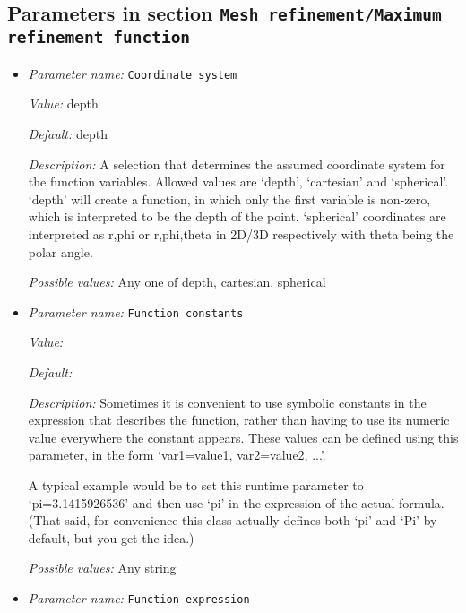 \subsection{Parameters in section \tt Mesh refinement/Maximum refinement function}
\label{parameters:Mesh_20refinement/Maximum_20refinement_20function}

\begin{itemize}
\item {\it Parameter name:} {\tt Coordinate system}
\label{parameters:Mesh refinement/Maximum refinement function/Coordinate system}


{\it Value:} depth


{\it Default:} depth


{\it Description:} A selection that determines the assumed coordinate system for the function variables. Allowed values are `depth', `cartesian' and `spherical'. `depth' will create a function, in which only the first variable is non-zero, which is interpreted to be the depth of the point. `spherical' coordinates are interpreted as r,phi or r,phi,theta in 2D/3D respectively with theta being the polar angle.


{\it Possible values:} Any one of depth, cartesian, spherical
\item {\it Parameter name:} {\tt Function constants}
\label{parameters:Mesh refinement/Maximum refinement function/Function constants}


{\it Value:} 


{\it Default:} 


{\it Description:} Sometimes it is convenient to use symbolic constants in the expression that describes the function, rather than having to use its numeric value everywhere the constant appears. These values can be defined using this parameter, in the form `var1=value1, var2=value2, ...'.

A typical example would be to set this runtime parameter to `pi=3.1415926536' and then use `pi' in the expression of the actual formula. (That said, for convenience this class actually defines both `pi' and `Pi' by default, but you get the idea.)


{\it Possible values:} Any string
\item {\it Parameter name:} {\tt Function expression}
\label{parameters:Mesh refinement/Maximum refinement function/Function expression}



\end{itemize}

